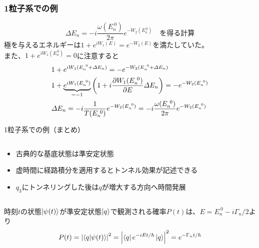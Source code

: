 \documentclass[14pt,aspectratio=169,xcolor=dvipsnames,table,dvipdfmx]{beamer}
\theoremstyle{definition}
\begin{document}
\begin{frame}
  \frametitle{1粒子系での例}
  \begin{equation*}
    \varDelta E_n = -i\frac{\omega(E_n^{~0})}{2\pi}e^{-W_2(E_n^{~0})}\quad\text{を得る計算}
  \end{equation*}
  極を与えるエネルギーは$1+e^{iW_1(E)}=e^{-W_2(E)}$を満たしていた。\\
  また、$1+e^{iW_1(E_n^{~0})}=0$に注意すると
  \begin{align*}
     & 1+e^{iW_1(E_n^{~0}+\varDelta E_n)}=-e^{-W_2(E_n^{~0}+\varDelta E_n)}                                          \\
     & 1+\underbrace{e^{iW_1(E_n^{~0})}}_{=-1}\qty(1+i\pdv{W_1(E_n^{~0})}{E}\varDelta E_n) = -e^{-W_2(E_n^{~0})}     \\
     & \varDelta E_n = -i\frac{1}{T(E_n^{~0})}e^{-W_2(E_n^{~0})} = -i\frac{\omega(E_n^{~0})}{2\pi}e^{-W_2(E_n^{~0})}
  \end{align*}



\end{frame}

\begin{frame}{1粒子系での例（まとめ）}
  \begin{columns}[t]
    \begin{column}{.5\textwidth}
      \begin{itemize}
        \item 古典的な基底状態は準安定状態
        \item 虚時間に経路積分を適用するとトンネル効果が記述できる
        \item $q_3$にトンネリングした後は$q$が増大する方向へ時間発展
      \end{itemize}
    \end{column}
    \begin{column}{.5\textwidth}
    \end{column}
  \end{columns}
  時刻$t$の状態$\ket{\psi(t)}$が準安定状態$\ket{q}$で観測される確率$P(t)$は、$E=E_n^{~0}-i\Gamma_n/2$より
  \begin{equation*}
    P(t) = \abs{\braket{q}{\psi(t)}}^2 = \abs{\bra{q}e^{-iEt/\hbar}\ket{q}}^2 = e^{-\Gamma_nt/\hbar}
  \end{equation*}
\end{frame}
\end{document}
